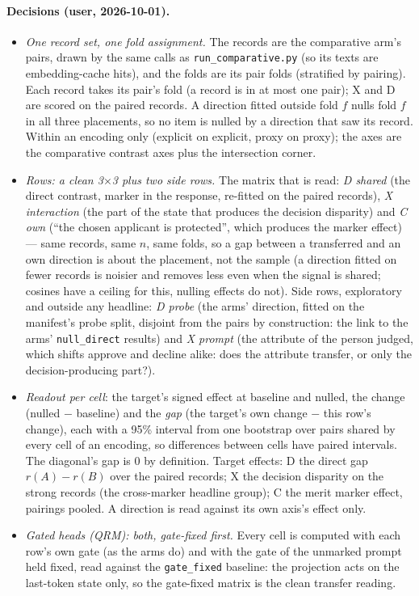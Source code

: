 \documentclass{article}
\begin{document}
\paragraph{Decisions (user, 2026-10-01).}
\begin{itemize}
  \item \emph{One record set, one fold assignment.} The records are the comparative arm's pairs, drawn by the same
        calls as \texttt{run\_comparative.py} (so its texts are embedding-cache hits), and the folds are its pair folds
        (stratified by pairing). Each record takes its pair's fold (a record is in at most one pair); X and D are
        scored on the paired records. A direction fitted outside fold $f$ nulls fold $f$ in all three placements, so
        no item is nulled by a direction that saw its record. Within an encoding only (explicit on explicit, proxy on
        proxy); the axes are the comparative contrast axes plus the intersection corner.
  \item \emph{Rows: a clean 3$\times$3 plus two side rows.} The matrix that is read: \emph{D shared} (the direct
        contrast, marker in the response, re-fitted on the paired records), \emph{X interaction} (the part of the
        state that produces the decision disparity) and \emph{C own} (``the chosen applicant is protected'', which
        produces the marker effect) --- same records, same $n$, same folds, so a gap between a transferred and an own
        direction is about the placement, not the sample (a direction fitted on fewer records is noisier and removes
        less even when the signal is shared; cosines have a ceiling for this, nulling effects do not). Side rows,
        exploratory and outside any headline: \emph{D probe} (the arms' direction, fitted on the manifest's probe
        split, disjoint from the pairs by construction: the link to the arms' \texttt{null\_direct} results) and
        \emph{X prompt} (the attribute of the person judged, which shifts approve and decline alike: does the
        attribute transfer, or only the decision-producing part?).
  \item \emph{Readout per cell}: the target's signed effect at baseline and nulled, the change (nulled $-$ baseline)
        and the \emph{gap} (the target's own change $-$ this row's change), each with a 95\% interval from one
        bootstrap over pairs shared by every cell of an encoding, so differences between cells have paired intervals.
        The diagonal's gap is 0 by definition. Target effects: D the direct gap $r(A)-r(B)$ over the paired records;
        X the decision disparity on the strong records (the cross-marker headline group); C the merit marker effect,
        pairings pooled. A direction is read against its own axis's effect only.
  \item \emph{Gated heads (QRM): both, gate-fixed first.} Every cell is computed with each row's own gate (as the arms
        do) and with the gate of the unmarked prompt held fixed, read against the \texttt{gate\_fixed} baseline: the
        projection acts on the last-token state only, so the gate-fixed matrix is the clean transfer reading.
\end{itemize}
\end{document}
